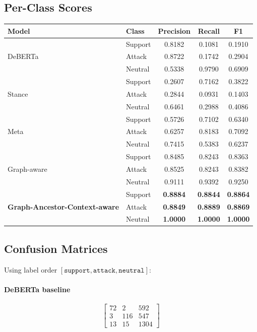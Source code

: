 \documentclass[11pt,a4paper]{article}
\begin{document}
\subsection{Per-Class Scores}
\begin{center}
\begin{tabular}{llccc}
\toprule
Model & Class & Precision & Recall & F1 \\
\midrule
\multirow{3}{*}{DeBERTa}
  & Support & 0.8182 & 0.1081 & 0.1910 \\
  & Attack  & 0.8722 & 0.1742 & 0.2904 \\
  & Neutral & 0.5338 & 0.9790 & 0.6909 \\
\midrule
\multirow{3}{*}{Stance}
  & Support & 0.2607 & 0.7162 & 0.3822 \\
  & Attack  & 0.2844 & 0.0931 & 0.1403 \\
  & Neutral & 0.6461 & 0.2988 & 0.4086 \\
\midrule
\multirow{3}{*}{Meta}
  & Support & 0.5726 & 0.7102 & 0.6340 \\
  & Attack  & 0.6257 & 0.8183 & 0.7092 \\
  & Neutral & 0.7415 & 0.5383 & 0.6237 \\
\midrule
\multirow{3}{*}{Graph-aware}
  & Support & 0.8485 & 0.8243 & 0.8363 \\
  & Attack  & 0.8525 & 0.8243 & 0.8382 \\
  & Neutral & 0.9111 & 0.9392 & 0.9250 \\
\midrule
\multirow{3}{*}{\textbf{Graph-Ancestor-Context-aware}}
  & Support & \textbf{0.8884} & \textbf{0.8844} & \textbf{0.8864} \\
  & Attack  & \textbf{0.8849} & \textbf{0.8889} & \textbf{0.8869} \\
  & Neutral & \textbf{1.0000} & \textbf{1.0000} & \textbf{1.0000} \\
\bottomrule
\end{tabular}
\end{center}

\subsection{Confusion Matrices}
Using label order \([\texttt{support}, \texttt{attack}, \texttt{neutral}]\):

\paragraph{DeBERTa baseline}
\[
\begin{bmatrix}
72 & 2 & 592 \\
3 & 116 & 547 \\
13 & 15 & 1304
\end{bmatrix}
\]
\end{document}
